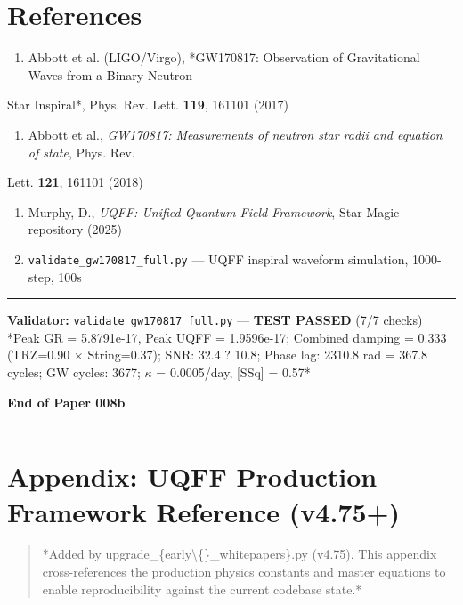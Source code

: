 \documentclass[11pt]{article}
\begin{document}
\section*{References}

\begin{enumerate}
  \item Abbott et al. (LIGO/Virgo), *GW170817: Observation of Gravitational Waves from a Binary Neutron
\end{enumerate}

Star Inspiral*, Phys. Rev. Lett. \textbf{119}, 161101 (2017)

\begin{enumerate}
  \item Abbott et al., \emph{GW170817: Measurements of neutron star radii and equation of state}, Phys. Rev.
\end{enumerate}

Lett. \textbf{121}, 161101 (2018)

\begin{enumerate}
  \item Murphy, D., \emph{UQFF: Unified Quantum Field Framework}, Star-Magic repository (2025)
  \item \verb|validate_gw170817_full.py| --- UQFF inspiral waveform simulation, 1000-step, 100s
\end{enumerate}

\noindent\rule{\textwidth}{0.4pt}

\textbf{Validator:} \verb|validate_gw170817_full.py| --- \textbf{TEST PASSED} (7/7 checks) *Peak GR = 5.8791e-17, Peak UQFF = 1.9596e-17; Combined damping = 0.333 (TRZ=0.90 $\times$ String=0.37); SNR: 32.4 ? 10.8; Phase lag: 2310.8 rad = 367.8 cycles; GW cycles: 3677; $\kappa$ = 0.0005/day, [SSq] = 0.57*

\textbf{End of Paper 008b}

\noindent\rule{\textwidth}{0.4pt}

\section*{Appendix: UQFF Production Framework Reference (v4.75+)}

\begin{quote}
*Added by upgrade\_\{early\textbackslash\{\}\_whitepapers\}.py (v4.75). This appendix cross-references
the production physics constants and master equations to enable reproducibility
against the current codebase state.*
\end{quote}
\end{document}
